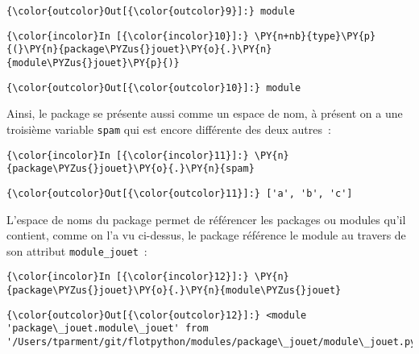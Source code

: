 \begin{Verbatim}[commandchars=\\\{\}]
{\color{outcolor}Out[{\color{outcolor}9}]:} module
\end{Verbatim}
            
    \begin{Verbatim}[commandchars=\\\{\}]
{\color{incolor}In [{\color{incolor}10}]:} \PY{n+nb}{type}\PY{p}{(}\PY{n}{package\PYZus{}jouet}\PY{o}{.}\PY{n}{module\PYZus{}jouet}\PY{p}{)}
\end{Verbatim}


\begin{Verbatim}[commandchars=\\\{\}]
{\color{outcolor}Out[{\color{outcolor}10}]:} module
\end{Verbatim}
            
    Ainsi, le package se présente aussi comme un espace de nom, à présent on
a une troisième variable \texttt{spam} qui est encore différente des
deux autres~:

    \begin{Verbatim}[commandchars=\\\{\}]
{\color{incolor}In [{\color{incolor}11}]:} \PY{n}{package\PYZus{}jouet}\PY{o}{.}\PY{n}{spam}
\end{Verbatim}


\begin{Verbatim}[commandchars=\\\{\}]
{\color{outcolor}Out[{\color{outcolor}11}]:} ['a', 'b', 'c']
\end{Verbatim}
            
    L'espace de noms du package permet de référencer les packages ou modules
qu'il contient, comme on l'a vu ci-dessus, le package référence le
module au travers de son attribut \texttt{module\_jouet}~:

    \begin{Verbatim}[commandchars=\\\{\}]
{\color{incolor}In [{\color{incolor}12}]:} \PY{n}{package\PYZus{}jouet}\PY{o}{.}\PY{n}{module\PYZus{}jouet}
\end{Verbatim}


\begin{Verbatim}[commandchars=\\\{\}]
{\color{outcolor}Out[{\color{outcolor}12}]:} <module 'package\_jouet.module\_jouet' from '/Users/tparment/git/flotpython/modules/package\_jouet/module\_jouet.py'>
\end{Verbatim}
            
